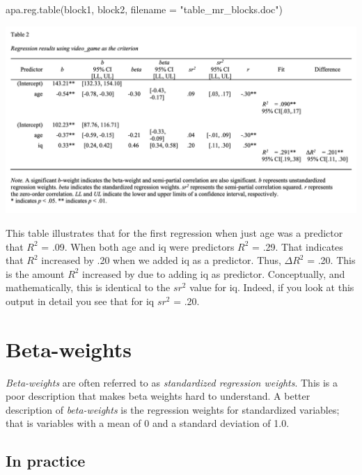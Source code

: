 \documentclass[
]{krantz}
\makeatletter
\newenvironment{Shaded}{\begin{snugshade}}{\end{snugshade}}
\newcommand{\AttributeTok}[1]{\textcolor[rgb]{0.61,0.61,0.61}{#1}}
\newcommand{\FunctionTok}[1]{\textcolor[rgb]{0,0,0}{#1}}
\newcommand{\NormalTok}[1]{#1}
\newcommand{\StringTok}[1]{\textcolor[rgb]{0.5,0.5,0.5}{#1}}
\newenvironment{kframe}{%
\medskip{}
\setlength{\fboxsep}{.8em}
 \def\at@end@of@kframe{}%
 \ifinner\ifhmode%
  \def\at@end@of@kframe{\end{minipage}}%
  \begin{minipage}{\columnwidth}%
 \fi\fi%
 \def\FrameCommand##1{\hskip\@totalleftmargin \hskip-\fboxsep
 \colorbox{shadecolor}{##1}\hskip-\fboxsep
     \hskip-\linewidth \hskip-\@totalleftmargin \hskip\columnwidth}%
 \MakeFramed {\advance\hsize-\width
   \@totalleftmargin\z@ \linewidth\hsize
   \@setminipage}}%
 {\par\unskip\endMakeFramed%
 \at@end@of@kframe}
\renewenvironment{Shaded}{\begin{kframe}}{\end{kframe}}
\makeatother
\begin{document}
\begin{Shaded}
\begin{Highlighting}[]
\FunctionTok{apa.reg.table}\NormalTok{(block1, block2,}
              \AttributeTok{filename =} \StringTok{"table\_mr\_blocks.doc"}\NormalTok{)}
\end{Highlighting}
\end{Shaded}

\includegraphics[width=0.9\linewidth]{ch_multiple_regression/images/mr_table_blocks}

This table illustrates that for the first regression when just age was a predictor that \(R^2\) = .09. When both age and iq were predictors \(R^2\) = .29. That indicates that \(R^2\) increased by .20 when we added iq as a predictor. Thus, \(\Delta R^2\) = .20. This is the amount \(R^2\) increased by due to adding iq as predictor. Conceptually, and mathematically, this is identical to the \(sr^2\) value for iq. Indeed, if you look at this output in detail you see that for iq \(sr^2\) = .20.

\hypertarget{beta-weights}{%
\section{Beta-weights}\label{beta-weights}}

\emph{Beta-weights} are often referred to as \emph{standardized regression weights}. This is a poor description that makes beta weights hard to understand. A better description of \emph{beta-weights} is the regression weights for standardized variables; that is variables with a mean of 0 and a standard deviation of 1.0.

\hypertarget{in-practice}{%
\subsection{In practice}\label{in-practice}}
\end{document}
